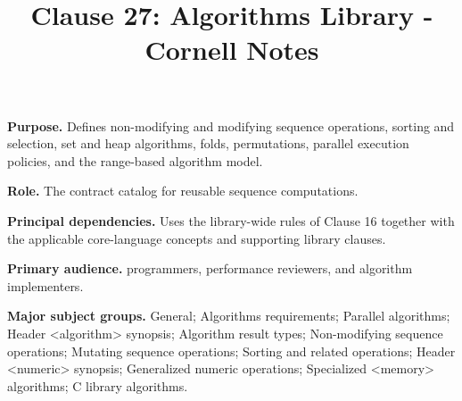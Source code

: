 \documentclass[11pt,letterpaper]{article}
\title{Clause 27: Algorithms Library - Cornell Notes}
\author{}
\date{}
\begin{document}
\maketitle
\begin{CornellReferenceOrientationBox}
\textbf{Purpose.} Defines non-modifying and modifying sequence operations, sorting and selection, set and heap algorithms, folds, permutations, parallel execution policies, and the range-based algorithm model.
\par\textbf{Role.} The contract catalog for reusable sequence computations.
\par\textbf{Principal dependencies.} Uses the library-wide rules of Clause 16 together with the applicable core-language concepts and supporting library clauses.
\par\textbf{Primary audience.} programmers, performance reviewers, and algorithm implementers.
\par\textbf{Major subject groups.} General; Algorithms requirements; Parallel algorithms; Header <algorithm> synopsis; Algorithm result types; Non-modifying sequence operations; Mutating sequence operations; Sorting and related operations; Header <numeric> synopsis; Generalized numeric operations; Specialized <memory> algorithms; C library algorithms.
\end{CornellReferenceOrientationBox}
\end{document}
